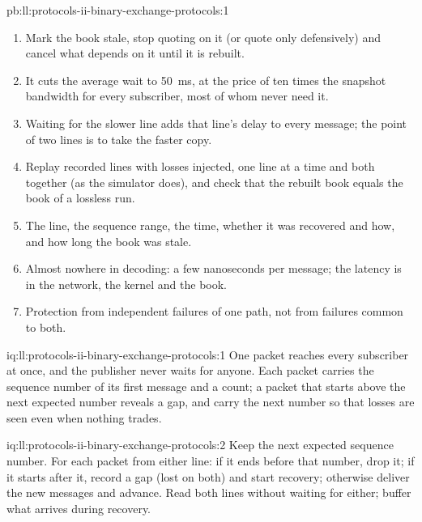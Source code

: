 \begin{solution}{pb:ll:protocols-ii-binary-exchange-protocols:1}
\begin{enumerate}
against \qty{0.5}{\milli\second} for a retransmission.
\item Mark the book stale, stop quoting on it (or quote only defensively) and cancel what depends on it until it is rebuilt.
\item It cuts the average wait to \qty{50}{\milli\second}, at the price of ten times the snapshot bandwidth for every
subscriber, most of whom never need it.
\item Waiting for the slower line adds that line's delay to every message; the point of two lines is to take the faster copy.
\item Replay recorded lines with losses injected, one line at a time and both together (as the simulator does), and check that
the rebuilt book equals the book of a lossless run.
\item The line, the sequence range, the time, whether it was recovered and how, and how long the book was stale.
\item Almost nowhere in decoding: a few nanoseconds per message; the latency is in the network, the kernel and the book.
\item Protection from independent failures of one path, not from failures common to both.
\end{enumerate}
\end{solution}

\begin{solution}{iq:ll:protocols-ii-binary-exchange-protocols:1}
One packet reaches every subscriber at once, and the publisher never waits for anyone. Each packet carries the sequence number
of its first message and a count; a packet that starts above the next expected number reveals a gap, and  carry the
next number so that losses are seen even when nothing trades.
\end{solution}

\begin{solution}{iq:ll:protocols-ii-binary-exchange-protocols:2}
Keep the next expected sequence number. For each packet from either line: if it ends before that number, drop it; if it starts
after it, record a gap (lost on both) and start recovery; otherwise deliver the new messages and advance. Read both lines
without waiting for either; buffer what arrives during recovery.
\end{solution}


